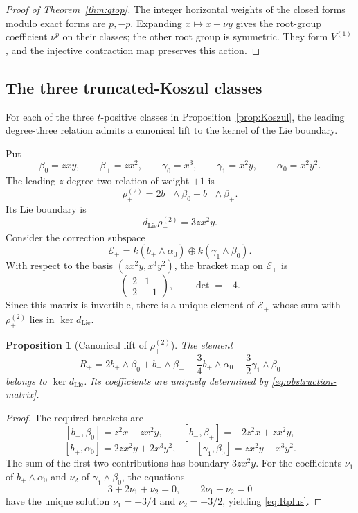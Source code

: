 \documentclass[11pt]{article}
\theoremstyle{plain}
\newtheorem{proposition}[proposition]{Proposition}
\theoremstyle{definition}
\theoremstyle{remark}
\numberwithin{equation}{section}
\newcommand{\kk}{k}
\begin{document}
\begin{proof}[Proof of Theorem~\ref{thm:qtop}]
The integer horizontal weights of the closed forms modulo exact forms
are \(p,-p\).
Expanding \(x\mapsto x+\nu y\) gives the root-group coefficient \(\nu^p\)
on their classes; the other root group is symmetric.
They form \(V^{(1)}\), and the injective contraction map preserves this action.
\end{proof}



\subsection{The three truncated-Koszul classes}\label{sec:truncated-koszul}

For each of the three $t$-positive classes in Proposition~\ref{prop:Koszul}, the leading
degree-three relation admits a canonical lift to the kernel of the Lie boundary.

Put
\[
 \beta_0=zxy,
 \qquad
 \beta_+=zx^2,
 \qquad
 \gamma_0=x^3,
 \qquad
 \gamma_1=x^2y,
 \qquad
 \alpha_0=x^2y^2.
\]
The leading $z$-degree-two relation of weight $+1$ is
\[
 \rho_+^{(2)}=2b_+\wedge \beta_0+b_-\wedge \beta_+.
\]
Its Lie boundary is
\[
 d_{\mathrm{Lie}}\rho_+^{(2)}=3zx^2y.
\]
Consider the correction subspace
\[
 \mathscr E_+=\kk(b_+\wedge \alpha_0)\oplus\kk(\gamma_1\wedge \beta_0).
\]
With respect to the basis $(zx^2y,x^3y^2)$, the bracket map on $\mathscr E_+$ is
\begin{equation}\label{eq:obstruction-matrix}
 \begin{pmatrix}2&1\\2&-1\end{pmatrix},
 \qquad \det=-4.
\end{equation}
Since this matrix is invertible, there is a unique element of $\mathscr E_+$ whose sum with
$\rho_+^{(2)}$ lies in $\ker d_{\mathrm{Lie}}$.

\begin{proposition}[Canonical lift of $\rho_+^{(2)}$]\label{prop:Rplus}
The element
\begin{equation}\label{eq:Rplus}
 R_+
 =2b_+\wedge \beta_0+b_-\wedge \beta_+
 -\frac34b_+\wedge \alpha_0
 -\frac32\gamma_1\wedge \beta_0
\end{equation}
belongs to $\ker d_{\mathrm{Lie}}$.  Its coefficients are uniquely determined by
\eqref{eq:obstruction-matrix}.
\end{proposition}

\begin{proof}
The required brackets are
\[
 {[b_+,\beta_0]}=z^2x+zx^2y,
 \qquad
 {[b_-,\beta_+]}=-2z^2x+zx^2y,
\]
\[
 {[b_+,\alpha_0]}=2zx^2y+2x^3y^2,
 \qquad
 {[\gamma_1,\beta_0]}=zx^2y-x^3y^2.
\]
The sum of the first two contributions has boundary $3zx^2y$.  For the coefficients
$\nu_1$ of $b_+\wedge\alpha_0$ and $\nu_2$ of $\gamma_1\wedge\beta_0$, the equations
\[
 3+2\nu_1+\nu_2=0,
 \qquad
 2\nu_1-\nu_2=0
\]
have the unique solution $\nu_1=-3/4$ and $\nu_2=-3/2$, yielding \eqref{eq:Rplus}.
\end{proof}
\end{document}
